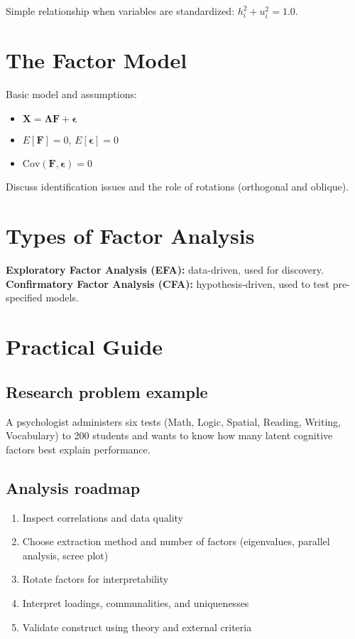 \documentclass[a4paper,11pt]{tufte-book}
\begin{document}
Simple relationship when variables are standardized: $h_i^2 + u_i^2 = 1.0$.

\section{The Factor Model}
Basic model and assumptions:
\begin{itemize}
  \item $\mathbf{X} = \mathbf{\Lambda F} + \mathbf{\epsilon}$
  \item $E[\mathbf{F}] = 0$, $E[\mathbf{\epsilon}] = 0$
  \item $\mathrm{Cov}(\mathbf{F},\mathbf{\epsilon}) = 0$
\end{itemize}

Discuss identification issues and the role of rotations (orthogonal and oblique).

\section{Types of Factor Analysis}
\textbf{Exploratory Factor Analysis (EFA):} data-driven, used for discovery.
\newline
\textbf{Confirmatory Factor Analysis (CFA):} hypothesis-driven, used to test pre-specified models.

\section{Practical Guide}

\subsection{Research problem example}
A psychologist administers six tests (Math, Logic, Spatial, Reading, Writing, Vocabulary) to 200 students and wants to know how many latent cognitive factors best explain performance.

\subsection{Analysis roadmap}
\begin{enumerate}
  \item Inspect correlations and data quality
  \item Choose extraction method and number of factors (eigenvalues, parallel analysis, scree plot)
  \item Rotate factors for interpretability
  \item Interpret loadings, communalities, and uniquenesses
  \item Validate construct using theory and external criteria
\end{enumerate}
\end{document}

